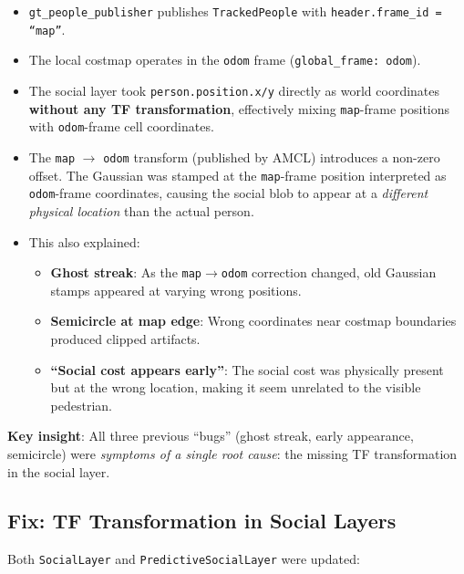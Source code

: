 \documentclass[11pt]{article}
\newcommand{\logentry}[1]{\subsection*{#1}}
\begin{document}
\begin{itemize}
  \item \texttt{gt\_people\_publisher} publishes \texttt{TrackedPeople} with
    \texttt{header.frame\_id = ``map''}.
  \item The local costmap operates in the \texttt{odom} frame
    (\texttt{global\_frame: odom}).
  \item The social layer took \texttt{person.position.x/y} directly as world
    coordinates \textbf{without any TF transformation}, effectively mixing
    \texttt{map}-frame positions with \texttt{odom}-frame cell coordinates.
  \item The \texttt{map} $\to$ \texttt{odom} transform (published by AMCL)
    introduces a non-zero offset. The Gaussian was stamped at the
    \texttt{map}-frame position interpreted as \texttt{odom}-frame coordinates,
    causing the social blob to appear at a \emph{different physical location}
    than the actual person.
  \item This also explained:
    \begin{itemize}
      \item \textbf{Ghost streak}: As the \texttt{map}$\to$\texttt{odom}
        correction changed, old Gaussian stamps appeared at varying wrong
        positions.
      \item \textbf{Semicircle at map edge}: Wrong coordinates near costmap
        boundaries produced clipped artifacts.
      \item \textbf{``Social cost appears early''}: The social cost was
        physically present but at the wrong location, making it seem unrelated
        to the visible pedestrian.
    \end{itemize}
\end{itemize}

\noindent\textbf{Key insight}: All three previous ``bugs'' (ghost streak,
early appearance, semicircle) were \emph{symptoms of a single root cause}:
the missing TF transformation in the social layer.

\logentry{Fix: TF Transformation in Social Layers}
Both \texttt{SocialLayer} and \texttt{PredictiveSocialLayer} were updated:
\end{document}
